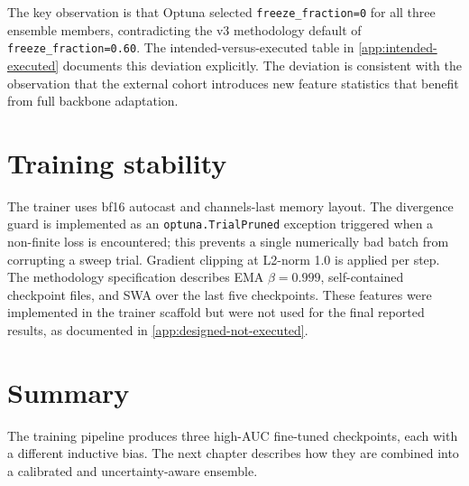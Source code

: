 \documentclass[../preamble.tex]{subfiles}
\begin{document}


The key observation is that Optuna selected \texttt{freeze\_fraction=0} for
all three ensemble members, contradicting the v3 methodology default of
\texttt{freeze\_fraction=0.60}. The intended-versus-executed table in
\cref{app:intended-executed} documents this deviation explicitly. The
deviation is consistent with the observation that the external cohort
introduces new feature statistics that benefit from full backbone
adaptation.

\section{Training stability}
\label{sec:train-stability}

The trainer uses bf16 autocast and channels-last memory layout. The
divergence guard is implemented as an \texttt{optuna.TrialPruned} exception
triggered when a non-finite loss is encountered; this prevents a single
numerically bad batch from corrupting a sweep trial. Gradient clipping at
L2-norm 1.0 is applied per step. The methodology specification describes EMA
$\beta=0.999$, self-contained checkpoint files, and SWA over the last five
checkpoints. These features were implemented in the trainer scaffold but
were not used for the final reported results, as documented in
\cref{app:designed-not-executed}.

\section{Summary}
\label{sec:train-summary}

The training pipeline produces three high-AUC fine-tuned checkpoints,
each with a different inductive bias. The next chapter describes how they
are combined into a calibrated and uncertainty-aware ensemble.
\end{document}
